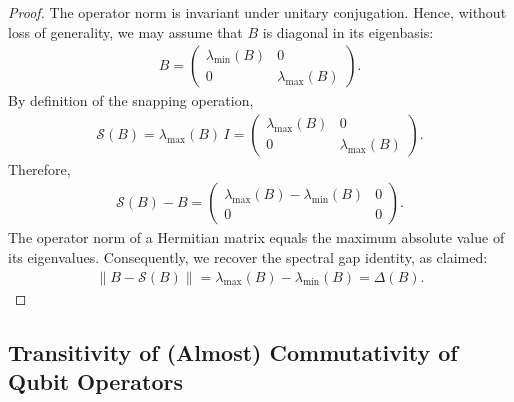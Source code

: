 \documentclass[11pt]{article}
\theoremstyle{plain}
\begin{document}
\begin{proof}
The operator norm is invariant under unitary conjugation. Hence, without loss of generality, we may assume that $B$ is diagonal in its eigenbasis:
\begin{align}
B =
\begin{pmatrix}
\lambda_{\min}(B) & 0 \\
0 & \lambda_{\max}(B)
\end{pmatrix}.
\end{align}
By definition of the snapping operation,
\begin{align}
\mathcal{S}(B) = \lambda_{\max}(B)\, I =
\begin{pmatrix}
\lambda_{\max}(B) & 0 \\
0 & \lambda_{\max}(B)
\end{pmatrix}.
\end{align}
Therefore,
\begin{align}
\mathcal{S}(B) - B =
\begin{pmatrix}
\lambda_{\max}(B) - \lambda_{\min}(B) & 0 \\
0 & 0
\end{pmatrix}.
\end{align}
The operator norm of a Hermitian matrix equals the maximum absolute value of its eigenvalues. Consequently, we recover the spectral gap identity, as claimed:
\begin{align}
\|B - \mathcal{S}(B)\|
= \lambda_{\max}(B) - \lambda_{\min}(B) = \Delta(B).
\end{align}
\end{proof}

\subsection{Transitivity of (Almost) Commutativity of Qubit Operators}
\end{document}
